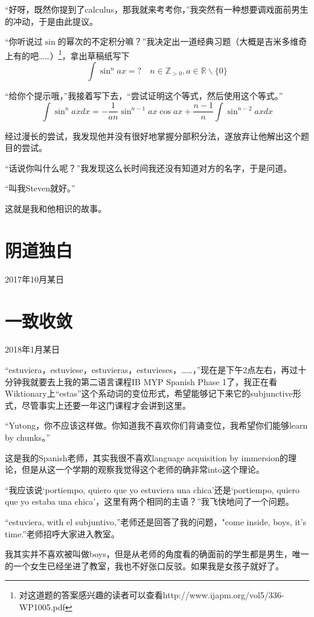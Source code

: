\documentclass{article}
\begin{document}
“好呀，既然你提到了calculus，那我就来考考你，”我突然有一种想要调戏面前男生的冲动，于是由此提议。

“你听说过$\sin$的幂次的不定积分嘛？”我决定出一道经典习题（大概是吉米多维奇上有的吧……）\footnote{对这道题的答案感兴趣的读者可以查看http://www.ijapm.org/vol5/336-WP1005.pdf}，拿出草稿纸写下
$$
\int\sin^nax=?\quad n\in\mathbb{Z}_{>0},a\in\mathbb{R}\mathbin{\backslash}\{0\}
$$

“给你个提示哦，”我接着写下去，“尝试证明这个等式，然后使用这个等式。”
$$
\int \sin ^{n} a x d x=-\frac{1}{an} \sin ^{n-1} a x \cos a x+\frac{n-1}{n} \int \sin ^{n-2} a x d x
$$

经过漫长的尝试，我发现他并没有很好地掌握分部积分法，遂放弃让他解出这个题目的尝试。

“话说你叫什么呢？”我发现这么长时间我还没有知道对方的名字，于是问道。

“叫我Steven就好。”

这就是我和他相识的故事。

\section{阴道独白}
2017年10月某日

\section{一致收敛}
2018年1月某日

“estuviera，estuviese，estuvieras，estuvieses，……，”现在是下午2点左右，再过十分钟我就要去上我的第二语言课程IB MYP Spanish Phase 1了，我正在看Wiktionary上“estas”这个系动词的变位形式，希望能够记下来它的subjunctive形式，尽管事实上还要一年这门课程才会讲到这里。

“Yutong，你不应该这样做。你知道我不喜欢你们背诵变位，我希望你们能够learn by chunks。”

这是我的Spanish老师，其实我很不喜欢language acquisition by immersion的理论，但是从这一个学期的观察我觉得这个老师的确非常into这个理论。

“我应该说‘portiempo, quiero que yo estuviera una chica’还是‘portiempo, quiero que yo estaba una chica’，这里有两个相同的主语？”我飞快地问了一个问题。

“estuviera, with el subjuntivo,”老师还是回答了我的问题，"come inside, boys, it's time.”老师招呼大家进入教室。

我其实并不喜欢被叫做boys，但是从老师的角度看的确面前的学生都是男生，唯一的一个女生已经坐进了教室，我也不好张口反驳。如果我是女孩子就好了。
\end{document}

